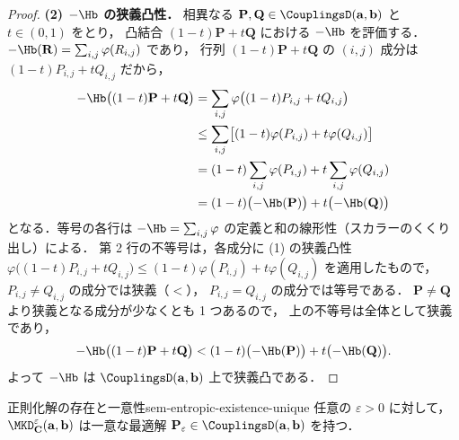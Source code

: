 \begin{proof}
  \textbf{(2) $-\Hb$ の狭義凸性．}
  相異なる $\mathbf{P}, \mathbf{Q} \in \CouplingsD(\mathbf{a}, \mathbf{b})$ と $t \in (0,1)$ をとり，
  凸結合 $(1-t)\mathbf{P} + t\mathbf{Q}$ における $-\Hb$ を評価する．
  $-\Hb(\mathbf{R}) = \sum_{i,j}\varphi(R_{i,j})$ であり，
  行列 $(1-t)\mathbf{P} + t\mathbf{Q}$ の $(i,j)$ 成分は $(1-t)P_{i,j} + tQ_{i,j}$ だから，
  \begin{align*}
    -\Hb\bigl((1-t)\mathbf{P} + t\mathbf{Q}\bigr)
    &= \sum_{i,j}\varphi\bigl((1-t)P_{i,j} + tQ_{i,j}\bigr) \\
    &\leq \sum_{i,j}\bigl[(1-t)\varphi(P_{i,j}) + t\varphi(Q_{i,j})\bigr] \\
    &= (1-t)\sum_{i,j}\varphi(P_{i,j}) + t\sum_{i,j}\varphi(Q_{i,j}) \\
    &= (1-t)\bigl(-\Hb(\mathbf{P})\bigr) + t\bigl(-\Hb(\mathbf{Q})\bigr)
  \end{align*}
  となる．等号の各行は $-\Hb = \sum_{i,j}\varphi$ の定義と和の線形性（スカラーのくくり出し）による．
  第 2 行の不等号は，各成分に (1) の狭義凸性
  $\varphi\bigl((1-t)P_{i,j}+tQ_{i,j}\bigr) \leq (1-t)\varphi(P_{i,j}) + t\varphi(Q_{i,j})$
  を適用したもので，$P_{i,j} \neq Q_{i,j}$ の成分では狭義（$<$），
  $P_{i,j} = Q_{i,j}$ の成分では等号である．
  $\mathbf{P} \neq \mathbf{Q}$ より狭義となる成分が少なくとも 1 つあるので，
  上の不等号は全体として狭義であり，
  \[
    -\Hb\bigl((1-t)\mathbf{P} + t\mathbf{Q}\bigr)
    < (1-t)\bigl(-\Hb(\mathbf{P})\bigr) + t\bigl(-\Hb(\mathbf{Q})\bigr).
  \]
  よって $-\Hb$ は $\CouplingsD(\mathbf{a}, \mathbf{b})$ 上で狭義凸である．
\end{proof}

\begin{proposition}{正則化解の存在と一意性}{sem-entropic-existence-unique}
  任意の $\varepsilon > 0$ に対して，
  $\MKD_{\mathbf{C}}^\varepsilon(\mathbf{a}, \mathbf{b})$ は一意な最適解
  $\mathbf{P}_\varepsilon \in \CouplingsD(\mathbf{a}, \mathbf{b})$ を持つ．
\end{proposition}

